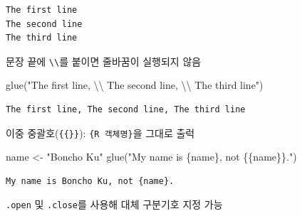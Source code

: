 \documentclass[
  11pt,
]{krantz}
\newenvironment{Shaded}{\begin{snugshade}}{\end{snugshade}}
\newcommand{\AttributeTok}[1]{\textcolor[rgb]{0.61,0.61,0.61}{#1}}
\newcommand{\DecValTok}[1]{\textcolor[rgb]{0.06,0.06,0.06}{#1}}
\newcommand{\FunctionTok}[1]{\textcolor[rgb]{0,0,0}{#1}}
\newcommand{\NormalTok}[1]{#1}
\newcommand{\OtherTok}[1]{\textcolor[rgb]{0.37,0.37,0.37}{#1}}
\newcommand{\SpecialCharTok}[1]{\textcolor[rgb]{0,0,0}{#1}}
\newcommand{\StringTok}[1]{\textcolor[rgb]{0.5,0.5,0.5}{#1}}
\begin{document}
\begin{verbatim}
The first line
The second line
The third line
\end{verbatim}

\normalsize

문장 끝에 \texttt{\textbackslash{}\textbackslash{}}를 붙이면 줄바꿈이 실행되지 않음

\footnotesize

\begin{Shaded}
\begin{Highlighting}[]
\FunctionTok{glue}\NormalTok{(}\StringTok{"The first line, }\SpecialCharTok{\textbackslash{}\textbackslash{}}
\StringTok{     The second line, }\SpecialCharTok{\textbackslash{}\textbackslash{}}
\StringTok{     The third line"}\NormalTok{)}
\end{Highlighting}
\end{Shaded}

\begin{verbatim}
The first line, The second line, The third line
\end{verbatim}

\normalsize

이중 중괄호(\texttt{\{\{\}\}}): \texttt{\{R\ 객체명\}}을 그대로 출럭

\footnotesize

\begin{Shaded}
\begin{Highlighting}[]
\NormalTok{name }\OtherTok{\textless{}{-}} \StringTok{"Boncho Ku"}
\FunctionTok{glue}\NormalTok{(}\StringTok{"My name is \{name\}, not \{\{name\}\}."}\NormalTok{)}
\end{Highlighting}
\end{Shaded}

\begin{verbatim}
My name is Boncho Ku, not {name}.
\end{verbatim}

\normalsize

\texttt{.open} 및 \texttt{.close}를 사용해 대체 구분기호 지정 가능

\footnotesize

\begin{Shaded}
\end{Shaded}
\end{document}
